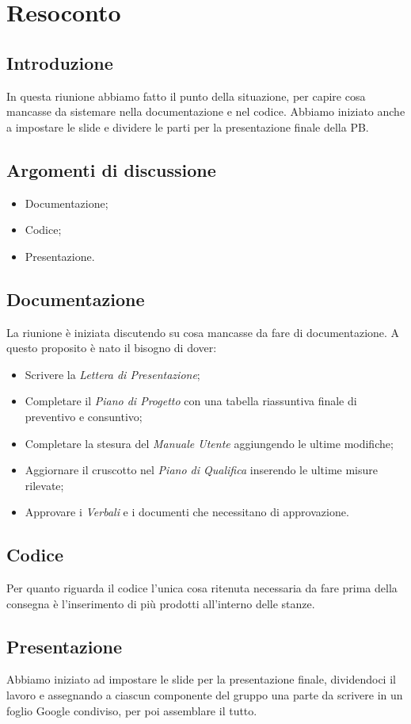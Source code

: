 \section{Resoconto}
\subsection{Introduzione}
In questa riunione abbiamo fatto il punto della situazione, per capire cosa mancasse da sistemare nella documentazione e nel codice. 
Abbiamo iniziato anche a impostare le slide e dividere le parti per la presentazione finale della PB.
\subsection{Argomenti di discussione}
\begin{itemize}
    \item Documentazione;
    \item Codice;
    \item Presentazione.
\end{itemize}
\subsection{Documentazione}
La riunione è iniziata discutendo su cosa mancasse da fare di documentazione. A questo proposito è nato il bisogno di 
dover:
\begin{itemize}
	\item Scrivere la \textit{Lettera di Presentazione};
	\item Completare il \textit{Piano di Progetto} con una tabella riassuntiva finale di preventivo e consuntivo;
	\item Completare la stesura del \textit{Manuale Utente} aggiungendo le ultime modifiche;
	\item Aggiornare il cruscotto nel \textit{Piano di Qualifica} inserendo le ultime misure rilevate;
	\item Approvare i \textit{Verbali} e i documenti che necessitano di approvazione.
\end{itemize}

\subsection{Codice}
Per quanto riguarda il codice l'unica cosa ritenuta necessaria da fare prima della consegna è l'inserimento di più prodotti all'interno delle stanze.

\subsection{Presentazione}
Abbiamo iniziato ad impostare le slide per la presentazione finale, dividendoci il lavoro e assegnando a ciascun componente del gruppo 
una parte da scrivere in un foglio Google condiviso, per poi assemblare il tutto.

